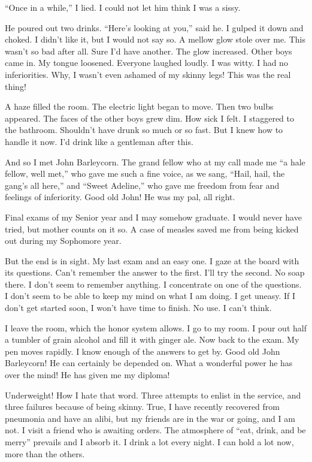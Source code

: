 \begin{biblechapter}
“Once in a while,” I lied. I could not let him think I was a sissy.

He poured out two drinks. “Here’s looking at you,” said he. I gulped it down and choked. I didn’t like it, but I would not say so. A mellow glow stole over me. This wasn’t so bad after all. Sure I’d have another. The glow increased. Other boys came in. My tongue loosened. Everyone laughed loudly. I was witty. I had no inferiorities. Why, I wasn’t even ashamed of my skinny legs! This was the real thing!

A haze filled the room. The electric light began to move. Then two bulbs appeared. The faces of the other boys grew dim. How sick I felt. I staggered to the bathroom. Shouldn’t have drunk so much or so fast. But I knew how to handle it now. I’d drink like a gentleman after this.

And so I met John Barleycorn. The grand fellow who at my call made me “a hale fellow, well met,” who gave me such a fine voice, as we sang, “Hail, hail, the gang’s all here,” and “Sweet Adeline,” who gave me freedom from fear and feelings of inferiority. Good old John! He was my pal, all right.

      Final exams of my Senior year and I may somehow graduate. I would never have tried, but mother counts on it so. A case of measles saved me from being kicked out during my Sophomore year.

But the end is in sight. My last exam and an easy one. I gaze at the board with its questions. Can’t remember the answer to the first. I’ll try the second. No soap there. I don’t seem to remember anything. I concentrate on one of the questions. I don’t seem to be able to keep my mind on what I am doing. I get uneasy. If I don’t get started soon, I won’t have time to finish. No use. I can’t think.

I leave the room, which the honor system allows. I go to my room. I pour out half a tumbler of grain alcohol and fill it with ginger ale. Now back to the exam. My pen moves rapidly. I know enough of the answers to get by. Good old John Barleycorn! He can certainly be depended on. What a wonderful power he has over the mind! He has given me my diploma!

Underweight! How I hate that word. Three attempts to enlist in the service, and three failures because of being skinny. True, I have recently recovered from pneumonia and have an alibi, but my friends are in the war or going, and I am not. I visit a friend who is awaiting orders. The atmosphere of “eat, drink, and be merry” prevails and I absorb it. I drink a lot every night. I can hold a lot now, more than the others.


\end{biblechapter}
